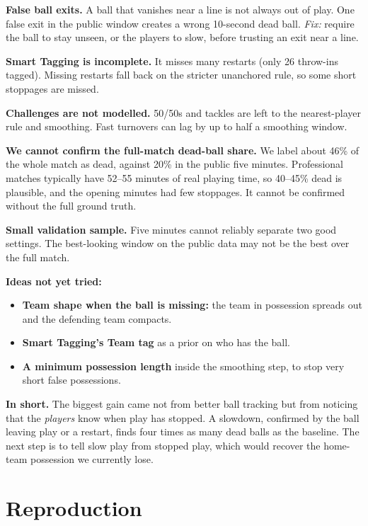 \documentclass[10pt,a4paper]{article}
\begin{document}
\textbf{False ball exits.} A ball that vanishes near a line is not always out of play. One false exit in the
public window creates a wrong 10-second dead ball. \emph{Fix:} require the ball to stay unseen, or the players to
slow, before trusting an exit near a line.

\textbf{Smart Tagging is incomplete.} It misses many restarts (only 26 throw-ins tagged). Missing restarts fall
back on the stricter unanchored rule, so some short stoppages are missed.

\textbf{Challenges are not modelled.} 50/50s and tackles are left to the nearest-player rule and smoothing.
Fast turnovers can lag by up to half a smoothing window.

\textbf{We cannot confirm the full-match dead-ball share.} We label about 46\% of the whole match as dead, against
20\% in the public five minutes. Professional matches typically have 52--55 minutes of real playing time, so
40--45\% dead is plausible, and the opening minutes had few stoppages. It cannot be confirmed without the full
ground truth.

\textbf{Small validation sample.} Five minutes cannot reliably separate two good settings. The best-looking
window on the public data may not be the best over the full match.

\textbf{Ideas not yet tried:}
\begin{itemize}
  \item \textbf{Team shape when the ball is missing:} the team in possession spreads out and the defending team compacts.
  \item \textbf{Smart Tagging's Team tag} as a prior on who has the ball.
  \item \textbf{A minimum possession length} inside the smoothing step, to stop very short false possessions.
\end{itemize}

\begin{callout}
\textbf{In short.} The biggest gain came not from better ball tracking but from noticing that the
\emph{players} know when play has stopped. A slowdown, confirmed by the ball leaving play or a restart, finds
four times as many dead balls as the baseline. The next step is to tell slow play from stopped play, which would
recover the home-team possession we currently lose.
\end{callout}

\section{Reproduction}
\end{document}
